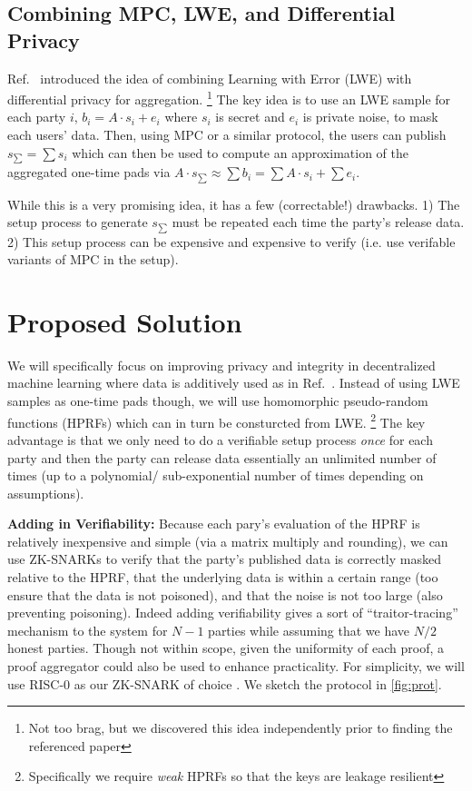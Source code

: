 \documentclass[11pt]{article}
\begin{document}
\subsection{Combining MPC, LWE, and Differential Privacy}
Ref.~\cite{stevens2021efficientdifferentiallyprivatesecure} introduced the idea of combining Learning with Error (LWE) with differential privacy for aggregation.
\footnote{Not too brag, but we discovered this idea independently prior to finding the referenced paper}
The key idea is to use an LWE sample for each party $i$, $b_i = A \cdot s_i + e_i$ where $s_i$ is secret and $e_i$ is private noise, to mask each users' data.
Then, using MPC or a similar protocol, the users can publish $s_{\sum} = \sum s_i$ which can then be used to compute an approximation of the aggregated one-time pads via $A \cdot s_{\sum} \approx \sum b_i = \sum A \cdot s_i + \sum e_i$.

While this is a very promising idea, it has a few (correctable!) drawbacks.
1) The setup process to generate $s_{\sum}$ must be repeated each time the party's release data.
2) This setup process can be expensive and expensive to verify (i.e. use verifable variants of MPC in the setup).


\section{Proposed Solution}
We will specifically focus on improving privacy and integrity in decentralized machine learning where data is additively used as in Ref.~\cite{stevens2021efficientdifferentiallyprivatesecure}.
Instead of using LWE samples as one-time pads though, we will use homomorphic pseudo-random functions (HPRFs)  which can in turn be consturcted from LWE.
\footnote{Specifically we require \emph{weak} HPRFs so that the keys are leakage resilient}
The key advantage is that we only need to do a verifiable setup process \emph{once} for each party and then the party can release data essentially an unlimited number of times (up to a polynomial/ sub-exponential number of times depending on assumptions).

\textbf{Adding in Verifiability:} Because each pary's evaluation of the HPRF is relatively inexpensive and simple (via a matrix multiply and rounding), we can use ZK-SNARKs to verify that the party's published data is correctly masked relative to the HPRF, that the underlying data is within a certain range (too ensure that the data is not poisoned), and that the noise is not too large (also preventing poisoning).
Indeed adding verifiability gives a sort of ``traitor-tracing'' mechanism to the system for $N - 1$ parties while assuming that we have $N /2$ honest parties.
Though not within scope, given the uniformity of each proof, a proof aggregator could also be used to enhance practicality.
For simplicity, we will use RISC-0 as our ZK-SNARK of choice .
We sketch the protocol in \cref{fig:prot}.
\end{document}

